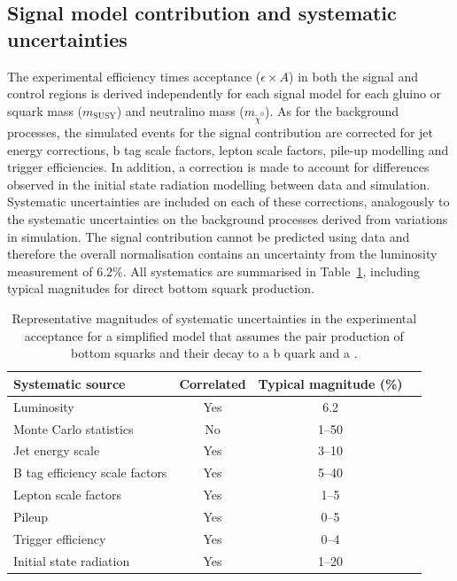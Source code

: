 \subsection{Signal model contribution and systematic uncertainties}

The experimental efficiency times acceptance ($\epsilon \times A$) in both the signal and 
control regions is derived independently for each signal model for each gluino or squark 
mass ($m_{\text{SUSY}}$) and neutralino mass ($m_{\tilde{\chi}^{0}}$). As for the 
background processes, the simulated events for the signal contribution are corrected for 
jet energy corrections, b tag scale factors, lepton scale factors, pile-up modelling and trigger efficiencies.
In addition, a correction is made to account for differences observed in the initial 
state radiation modelling between data and simulation. Systematic uncertainties are included 
on each of these corrections, analogously to the systematic uncertainties on the background processes derived from
variations in simulation. The signal contribution cannot be predicted using data and therefore the overall normalisation contains an uncertainty
from the luminosity measurement of 6.2\%. All systematics are summarised
in Table~\ref{tab:signal_systs}, including typical magnitudes for direct bottom squark production.

\begin{table}[h!]
  \caption{
    Representative magnitudes of systematic uncertainties in the
    experimental acceptance for a simplified model that assumes the 
    pair production of bottom squarks and their decay to a b
    quark and a \chiz.}  
  \label{tab:signal_systs}
  \centering
  \footnotesize
  \begin{tabular}{ lccc }
    \hline
    Systematic source\T\B          & Correlated & Typical magnitude (\%) \\
    \hline
    Luminosity\T                   & Yes        & 6.2                    \\
    Monte Carlo statistics         & No         & 1--50                  \\
    Jet energy scale               & Yes        & 3--10                  \\
    B tag efficiency scale factors & Yes        & 5--40                  \\
    Lepton scale factors           & Yes        & 1--5                   \\
    Pileup                        & Yes        & 0--5                   \\
    Trigger efficiency             & Yes        & 0--4                   \\
    Initial state radiation        & Yes        & 1--20                  \\
    \hline
  \end{tabular}
\end{table}


